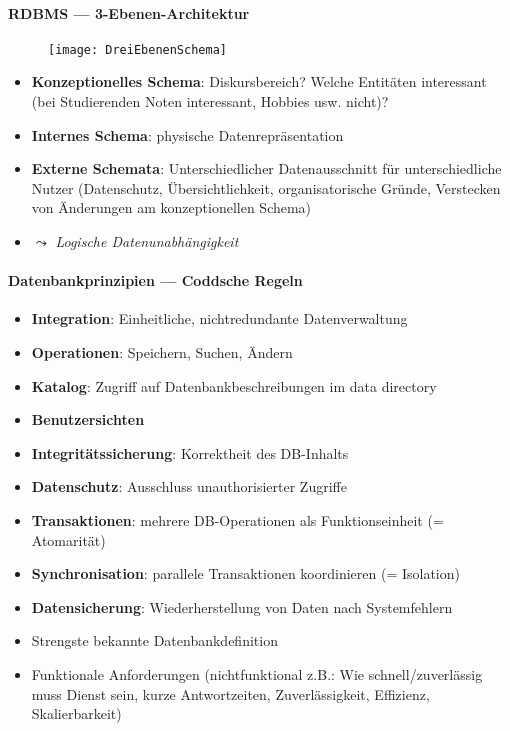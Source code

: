 \paragraph{RDBMS --- 3-Ebenen-Architektur}
\begin{figure}[H]\centering\label{DreiEbenenSchema}\texttt{[image: DreiEbenenSchema]}\end{figure}
\begin{itemize}
  \item \textbf{Konzeptionelles Schema}: Diskursbereich? Welche Entitäten interessant (bei Studierenden Noten interessant, Hobbies usw. nicht)?
  \item \textbf{Internes Schema}: physische Datenrepräsentation
  \item \textbf{Externe Schemata}: Unterschiedlicher Datenausschnitt für unterschiedliche Nutzer (Datenschutz, Übersichtlichkeit, organisatorische Gründe, Verstecken von Änderungen am konzeptionellen Schema)
  \item \( \leadsto \) \emph{Logische Datenunabhängigkeit}
\end{itemize}



\paragraph{Datenbankprinzipien --- Coddsche Regeln}
\begin{itemize}
  \item \textbf{Integration}: Einheitliche, nichtredundante Datenverwaltung
  \item \textbf{Operationen}: Speichern, Suchen, Ändern
  \item \textbf{Katalog}: Zugriff auf Datenbankbeschreibungen im data directory
  \item \textbf{Benutzersichten}
  \item \textbf{Integritätssicherung}: Korrektheit des DB-Inhalts
  \item \textbf{Datenschutz}: Ausschluss unauthorisierter Zugriffe
  \item \textbf{Transaktionen}: mehrere DB-Operationen als Funktionseinheit (= Atomarität)
  \item \textbf{Synchronisation}: parallele Transaktionen koordinieren (= Isolation)
  \item \textbf{Datensicherung}: Wiederherstellung von Daten nach Systemfehlern
  \item Strengste bekannte Datenbankdefinition
  \item Funktionale Anforderungen (nichtfunktional z.B.: Wie schnell/zuverlässig muss Dienst sein, kurze Antwortzeiten, Zuverlässigkeit, Effizienz, Skalierbarkeit)
\end{itemize}

